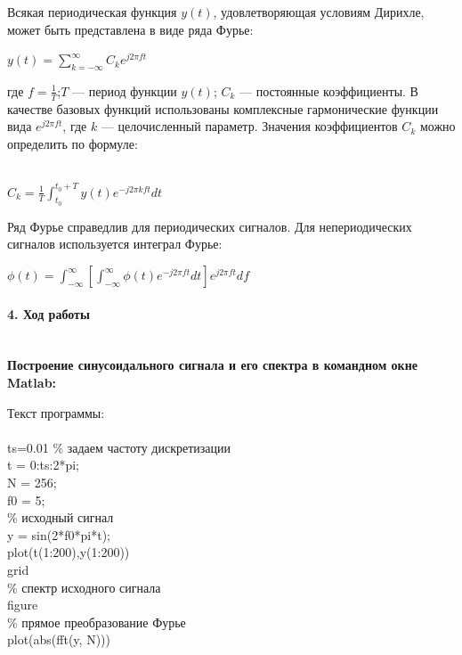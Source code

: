 \documentclass[12pt,a4paper]{report}
\begin{document}
Всякая периодическая функция $y(t)$, удовлетворяющая условиям Дирихле, может быть представлена в виде ряда Фурье:
  \begin{center}
		$y(t) = \sum_{k=-\infty}^{\infty}C_ke^{j2{\pi}ft}$ \\
  \end{center}
где $f=\frac{1}{T}$;$T$ --- период функции $y(t)$; $C_k$ --- постоянные коэффициенты.
В качестве базовых функций использованы комплексные гармонические функции вида $e^{j2{\pi}ft}$, где $k$ --- целочисленный параметр. Значения коэффициентов $C_k$ можно определить по формуле:\\\\
  \begin{center}
		$C_k = \frac{1}{T}\int_{t_0}^{t_0+T}y(t)e^{-j2{\pi}kft}dt$\\
  \end{center}
Ряд Фурье справедлив для периодических сигналов. Для непериодических сигналов используется интеграл Фурье:
  \begin{center}
${\phi}(t)=\int_{-\infty}^{\infty}{[\int_{-\infty}^{\infty}{{\phi}(t)e^{-j2{\pi}ft}dt}]e^{j2{\pi}ft}df}$
  \end{center}


\paragraph{4. Ход работы\\\\}
\textbf{Построение синусоидального сигнала и его спектра в командном окне Matlab:\\}

Текст программы:\\
\\
ts=0.01 \% задаем частоту дискретизации\\
t = 0:ts:2*pi; \\
N = 256;\\
f0 = 5;\\
\% исходный сигнал\\
y = sin(2*f0*pi*t);\\
plot(t(1:200),y(1:200)) \\
grid\\
\% спектр исходного сигнала\\
figure\\
\% прямое преобразование Фурье\\
plot(abs(fft(y, N)))\\
\end{document}
